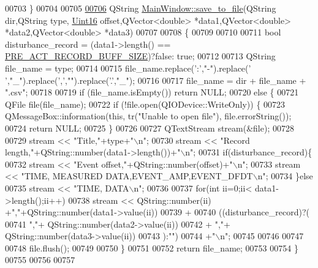 \begin{DoxyCode}
00703 \}
00704 
00705 
\hypertarget{a00109_source_l00706}{}\hyperlink{a00017_a0114355b9f626345cf77d6f714f51468}{00706} QString \hyperlink{a00017_a0114355b9f626345cf77d6f714f51468}{MainWindow::save\_to\_file}(QString dir,QString type,
      \hyperlink{a00004_aae7407b021d43f7193a81a58cfb3e297}{Uint16} offset,QVector<double> *data1,QVector<double> *data2,QVector<double> *data3)
00707 
00708 \{
00709 
00710 
00711     \textcolor{keywordtype}{bool} disturbance\_record = (data1->length() == \hyperlink{a00006_a18dcecc16ded13fa622e0913e73442e6}{PRE\_ACT\_RECORD\_BUFF\_SIZE})?\textcolor{keyword}{false}:\textcolor{keyword}{
      true};
00712 
00713     QString file\_name = type;
00714 
00715     file\_name.replace(\textcolor{charliteral}{':'},\textcolor{stringliteral}{"-"}).replace(\textcolor{charliteral}{' '},\textcolor{stringliteral}{"\_"}).replace(\textcolor{charliteral}{','},\textcolor{stringliteral}{""}).replace(\textcolor{charliteral}{'.'},\textcolor{stringliteral}{"\_"});
00716 
00717     file\_name = dir + file\_name + \textcolor{stringliteral}{".csv"};
00718 
00719     \textcolor{keywordflow}{if} (file\_name.isEmpty()) \textcolor{keywordflow}{return} NULL;
00720     \textcolor{keywordflow}{else} \{
00721         QFile file(file\_name);
00722         \textcolor{keywordflow}{if} (!file.open(QIODevice::WriteOnly)) \{
00723             QMessageBox::information(\textcolor{keyword}{this}, tr(\textcolor{stringliteral}{"Unable to open file"}), file.errorString());
00724             \textcolor{keywordflow}{return} NULL;
00725         \}
00726 
00727         QTextStream stream(&file);
00728 
00729         stream << \textcolor{stringliteral}{"Title,"}+type+\textcolor{stringliteral}{"\(\backslash\)n"};
00730         stream << \textcolor{stringliteral}{"Record length,"}+QString::number(data1->length())+\textcolor{stringliteral}{"\(\backslash\)n"};
00731         \textcolor{keywordflow}{if}(disturbance\_record)\{
00732         stream << \textcolor{stringliteral}{"Event offset,"}+QString::number(offset)+\textcolor{stringliteral}{"\(\backslash\)n"};
00733         stream << \textcolor{stringliteral}{"TIME, MEASURED DATA,EVENT\_AMP,EVENT\_DFDT\(\backslash\)n"};
00734         \}\textcolor{keywordflow}{else}
00735         stream << \textcolor{stringliteral}{"TIME, DATA\(\backslash\)n"};
00736 
00737         \textcolor{keywordflow}{for}(\textcolor{keywordtype}{int} ii=0;ii< data1->length();ii++)
00738            stream << QString::number(ii) +\textcolor{stringliteral}{","}+QString::number(data1->value(ii))
00739                      +
00740                      ((disturbance\_record)?(
00741                      \textcolor{stringliteral}{","}+ QString::number(data2->value(ii))
00742                      + \textcolor{stringliteral}{","}+ QString::number(data3->value(ii))
00743                      ):\textcolor{stringliteral}{""})
00744                      +\textcolor{stringliteral}{"\(\backslash\)n"};
00745 
00746 
00747 
00748         file.flush();
00749 
00750      \}
00751 
00752     \textcolor{keywordflow}{return} file\_name;
00753 
00754 \}
00755 
00756 
00757 
\end{DoxyCode}
